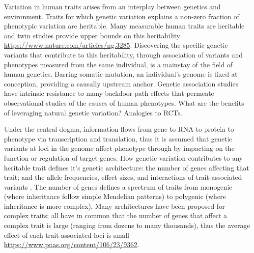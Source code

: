 \begin{outline}
\1 Variation in human traits arises from an interplay between genetics and environment.
Traits for which genetic variation explains a non-zero fraction of phenotypic variation are heritable.
Many measurable human traits are heritable and twin studies provide upper bounds on this heritability \url{https://www.nature.com/articles/ng.3285}.
Discovering the specific genetic variants that contribute to this heritability, through association of variants and phenotypes measured from the same individual, is a mainstay of the field of human genetics.
Barring somatic mutation, an individual's genome is fixed at conception, providing a causally upstream anchor.
Genetic association studies have intrinsic resistance to many backdoor path effects that permeate observational studies of the causes of human phenotypes.
    \2 What are the benefits of leveraging natural genetic variation? Analogies to RCTs.

\1 Under the central dogma, information flows from gene to RNA to protein to phenotype via transcription and translation, 
thus it is assumed that genetic variants at loci in the genome affect phenotype through by impacting on the function or regulation of target genes.
How genetic variation contributes to any heritable trait defines it's genetic architecture: the number of genes affecting that trait; and the allele frequencies, effect sizes, and interactions of trait-associated variants \autocite{visscher2019Fisher1918Paper}.
The number of genes defines a spectrum of traits from monogenic (where inheritance follow simple Mendelian patterns) to polygenic (where inheritance is more complex).
Many architectures have been proposed for complex traits; all have in common that the number of genes that affect a complex trait is large (ranging from dozens to many thousands),
thus the average effect of each trait-associated loci is small \autocite{gibson2011RareCommonVariants,boyle2017ExpandedViewComplex} \url{https://www.pnas.org/content/106/23/9362}.


\end{outline}
